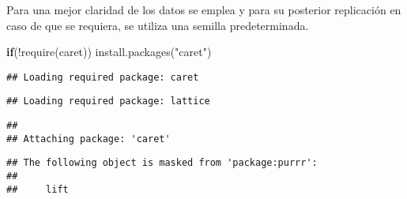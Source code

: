 \documentclass[
]{article}
\newenvironment{Shaded}{\begin{snugshade}}{\end{snugshade}}
\newcommand{\ControlFlowTok}[1]{\textcolor[rgb]{0.13,0.29,0.53}{\textbf{#1}}}
\newcommand{\FunctionTok}[1]{\textcolor[rgb]{0.00,0.00,0.00}{#1}}
\newcommand{\NormalTok}[1]{#1}
\newcommand{\SpecialCharTok}[1]{\textcolor[rgb]{0.00,0.00,0.00}{#1}}
\newcommand{\StringTok}[1]{\textcolor[rgb]{0.31,0.60,0.02}{#1}}
\begin{document}
Para una mejor claridad de los datos se emplea y para su posterior
replicación en caso de que se requiera, se utiliza una semilla
predeterminada.

\begin{Shaded}
\begin{Highlighting}[]
\ControlFlowTok{if}\NormalTok{(}\SpecialCharTok{!}\FunctionTok{require}\NormalTok{(caret))}
  \FunctionTok{install.packages}\NormalTok{(}\StringTok{"caret"}\NormalTok{)}
\end{Highlighting}
\end{Shaded}

\begin{verbatim}
## Loading required package: caret
\end{verbatim}

\begin{verbatim}
## Loading required package: lattice
\end{verbatim}

\begin{verbatim}
## 
## Attaching package: 'caret'
\end{verbatim}

\begin{verbatim}
## The following object is masked from 'package:purrr':
## 
##     lift
\end{verbatim}
\end{document}
